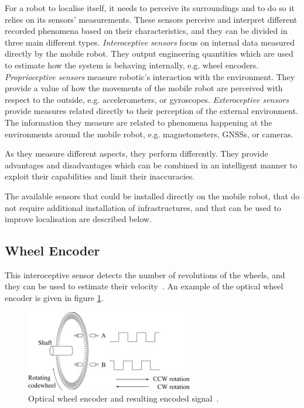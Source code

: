 \noindent For a robot to localise itself, it needs to perceive its surroundings and to do so it relies on its sensors' measurements.
These sensors perceive and interpret different recorded phenomena based on their characteristics, and they can be divided in three main different types.
\textit{Interoceptive sensors} focus on internal data measured directly by the mobile robot. They output engineering quantities which are used to estimate how the system is behaving internally, e.g. wheel encoders.
\textit{Proprioceptive sensors} measure robotic's interaction with the environment. They provide a value of how the movements of the mobile robot are perceived with respect to the outside, e.g. accelerometers, or gyroscopes.
\textit{Exteroceptive sensors} provide measures related directly to their perception of the external environment. The information they measure are related to phenomena happening at the environments around the mobile robot, e.g. magnetometers, \glspl{GNSS}, or cameras.

As they measure different aspects, they perform differently.
They provide advantages and disadvantages which can be combined in an intelligent manner to exploit their capabilities and limit their inaccuracies.

The available sensors that could be installed directly on the mobile robot, that do not require additional installation of infrastructures, and that can be used to improve localisation are described below.

\subsection{Wheel Encoder}

\noindent This interoceptive sensor detects the number of revolutions of the wheels, and they can be used to estimate their velocity~\cite{encoder}. An example of the optical wheel encoder is given in figure \ref{fig:encoder}.
\begin{figure}[!ht]
  \begin{center}
    \includegraphics[width=0.65\textwidth]{Images/2-Background/Enc.jpg}
  \end{center}
  \caption{Optical wheel encoder and resulting encoded signal~\cite{wheelEncoder}.}
  \label{fig:encoder}
\end{figure}

